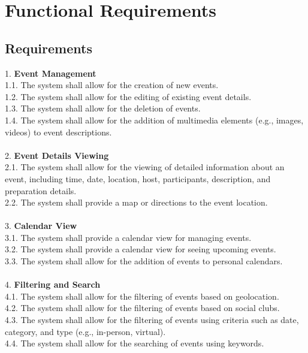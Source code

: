 \documentclass[a4paper,12pt]{article}
\begin{document}
\section{Functional Requirements}
\label{sec:functional-requirements}

\subsection{Requirements}

1. \textbf{Event Management}\\
    1.1. The system shall allow for the creation of new events.\\
    1.2. The system shall allow for the editing of existing event details.\\
    1.3. The system shall allow for the deletion of events.\\
    1.4. The system shall allow for the addition of multimedia elements (e.g., images, videos) to event descriptions.\\\\
2. \textbf{Event Details Viewing}\\
    2.1. The system shall allow for the viewing of detailed information about an event, including time, date, location, host, participants, description, and preparation details.\\
    2.2. The system shall provide a map or directions to the event location.\\\\
3. \textbf{Calendar View}\\
    3.1. The system shall provide a calendar view for managing events.\\
    3.2. The system shall provide a calendar view for seeing upcoming events.\\
    3.3. The system shall allow for the addition of events to personal calendars.\\\\
4. \textbf{Filtering and Search}\\
    4.1. The system shall allow for the filtering of events based on geolocation.\\
    4.2. The system shall allow for the filtering of events based on social clubs.\\
    4.3. The system shall allow for the filtering of events using criteria such as date, category, and type (e.g., in-person, virtual).\\
    4.4. The system shall allow for the searching of events using keywords.\\
\end{document}
